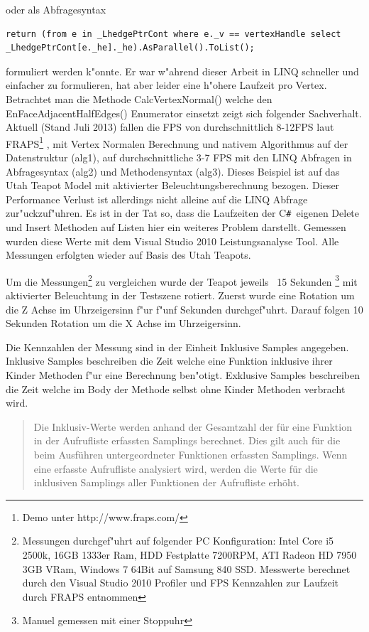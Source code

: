 \documentclass[pagesize, paper=a4, fontsize=12pt,titlepage=true, headings=small, headnosepline, abstractoff, liststotoc, nochapterprefix, plainheadsepline]{scrreprt}
\newcommand{\CSS}{C\texttt{\# }}
\begin{document}
oder als Abfragesyntax
\begin{lstlisting}[label={code:alg2}]
return (from e in _LhedgePtrCont where e._v == vertexHandle select _LhedgePtrCont[e._he]._he).AsParallel().ToList();
\end{lstlisting}
 formuliert werden k"onnte. Er war w"ahrend dieser Arbeit in LINQ schneller und einfacher zu formulieren, hat aber leider eine h"ohere Laufzeit pro Vertex. Betrachtet man die Methode CalcVertexNormal() welche den EnFaceAdjacentHalfEdges() Enumerator einsetzt zeigt sich folgender Sachverhalt. Aktuell (Stand Juli 2013) fallen die FPS von durchschnittlich 8-12FPS laut FRAPS\footnote{ Demo unter http://www.fraps.com/} , mit Vertex Normalen Berechnung und nativem Algorithmus auf der Datenstruktur (alg1\label{code:alg1}), auf durchschnittliche 3-7 FPS mit den LINQ Abfragen in Abfragesyntax (alg2\label{code:alg2}) und Methodensyntax (alg3\label{code:alg3}). Dieses Beispiel ist auf das Utah Teapot Model mit aktivierter Beleuchtungsberechnung bezogen. Dieser Performance Verlust ist allerdings nicht alleine auf die LINQ Abfrage zur"uckzuf"uhren. Es ist in der Tat so, dass die Laufzeiten der \CSS eigenen Delete und Insert Methoden auf Listen hier ein weiteres Problem darstellt. Gemessen wurden diese Werte mit dem Visual Studio 2010 Leistungsanalyse Tool. Alle Messungen erfolgten wieder auf Basis des Utah Teapots.
\newline

Um die Messungen\footnote{\label{fn-messungenPC} Messungen durchgef"uhrt auf folgender PC Konfiguration: Intel Core i5 2500k, 16GB 1333er Ram, HDD Festplatte 7200RPM, ATI Radeon HD 7950 3GB VRam, Windows 7 64Bit auf Samsung 840 SSD. Messwerte berechnet durch den Visual Studio 2010 Profiler und FPS Kennzahlen zur Laufzeit durch FRAPS entnommen} zu vergleichen wurde der Teapot jeweils ~15 Sekunden \footnote{Manuel gemessen mit einer Stoppuhr} mit aktivierter Beleuchtung in der Testszene rotiert. Zuerst wurde eine Rotation um die Z Achse im Uhrzeigersinn f"ur f"unf Sekunden durchgef"uhrt. Darauf folgen 10 Sekunden Rotation um die X Achse im Uhrzeigersinn.

Die Kennzahlen der Messung sind in der Einheit Inklusive Samples angegeben. Inklusive Samples beschreiben die Zeit welche eine Funktion inklusive ihrer Kinder Methoden f"ur eine Berechnung ben"otigt. Exklusive Samples beschreiben die Zeit welche im Body der Methode selbst ohne Kinder Methoden verbracht wird.

\begin{quote}Die Inklusiv-Werte werden anhand der Gesamtzahl der f{\"u}r eine Funktion in der Aufrufliste erfassten Samplings berechnet. Dies gilt auch f{\"u}r die beim Ausf{\"u}hren untergeordneter Funktionen erfassten Samplings. Wenn eine erfasste Aufrufliste analysiert wird, werden die Werte f{\"u}r die inklusiven Samplings aller Funktionen der Aufrufliste erh{\"o}ht. \cite[Analyse von Leistungsdaten]{MicrosoftCReferenz.2013}\end{quote}
\end{document}

